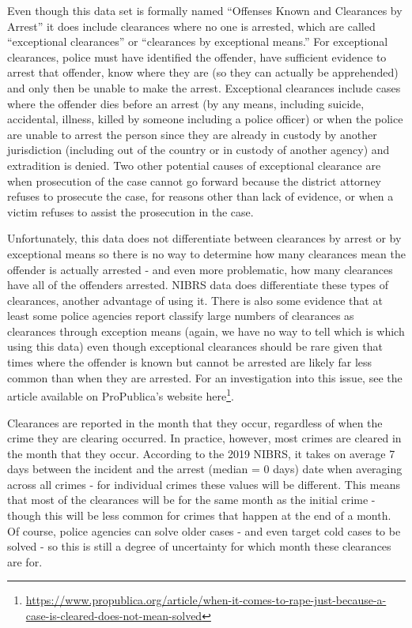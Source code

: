 \documentclass[
]{krantz}
\renewcommand{\href}[2]{#2\footnote{\url{#1}}}
\begin{document}
Even though this data set is formally named ``Offenses Known
and Clearances by Arrest'' it does include clearances where
no one is arrested, which are called ``exceptional
clearances'' or ``clearances by exceptional means.'' For
exceptional clearances, police must have identified the
offender, have sufficient evidence to arrest that offender,
know where they are (so they can actually be apprehended)
and only then be unable to make the arrest. Exceptional
clearances include cases where the offender dies before an
arrest (by any means, including suicide, accidental,
illness, killed by someone including a police officer) or
when the police are unable to arrest the person since they
are already in custody by another jurisdiction (including
out of the country or in custody of another agency) and
extradition is denied. Two other potential causes of
exceptional clearance are when prosecution of the case
cannot go forward because the district attorney refuses to
prosecute the case, for reasons other than lack of evidence,
or when a victim refuses to assist the prosecution in the
case.

Unfortunately, this data does not differentiate between
clearances by arrest or by exceptional means so there is no
way to determine how many clearances mean the offender is
actually arrested - and even more problematic, how many
clearances have all of the offenders arrested. NIBRS data
does differentiate these types of clearances, another
advantage of using it. There is also some evidence that at
least some police agencies report classify large numbers of
clearances as clearances through exception means (again, we
have no way to tell which is which using this data) even
though exceptional clearances should be rare given that
times where the offender is known but cannot be arrested are
likely far less common than when they are arrested. For an
investigation into this issue, see the
\citet{yeung2018comes} article available on ProPublica's
website
\href{https://www.propublica.org/article/when-it-comes-to-rape-just-because-a-case-is-cleared-does-not-mean-solved}{here}.

Clearances are reported in the month that they occur,
regardless of when the crime they are clearing occurred. In
practice, however, most crimes are cleared in the month that
they occur. According to the 2019 NIBRS, it takes on average
7 days between the incident and the arrest (median = 0 days)
date when averaging across all crimes - for individual
crimes these values will be different. This means that most
of the clearances will be for the same month as the initial
crime - though this will be less common for crimes that
happen at the end of a month. Of course, police agencies can
solve older cases - and even target cold cases to be solved
- so this is still a degree of uncertainty for which month
these clearances are for.
\end{document}
